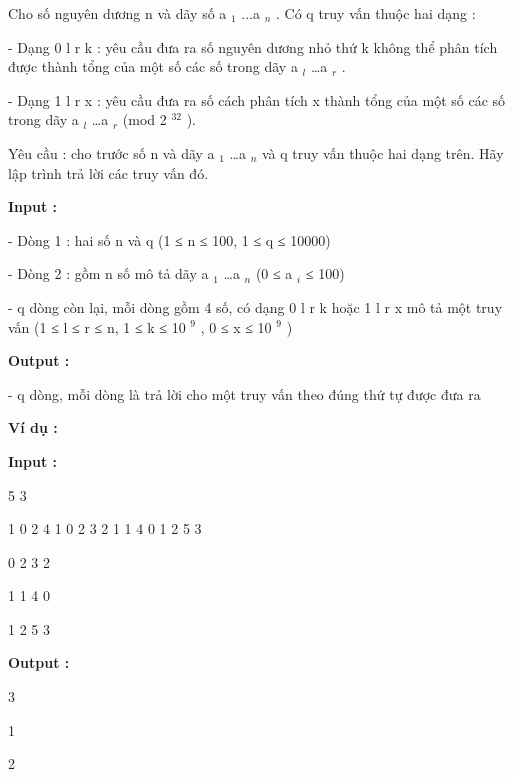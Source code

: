 







   Cho số nguyên dương n và dãy số a   $_    1   $   ...a   $_    n   $   . Có q truy vấn thuộc hai dạng :  

   - Dạng 0 l r k : yêu cầu đưa ra số nguyên dương nhỏ thứ k không thể phân tích được thành tổng của một số các số trong dãy a   $_    l   $   …a   $_    r   $   .  

   - Dạng 1 l r x : yêu cầu đưa ra số cách phân tích x thành tổng của một số các số trong dãy a   $_    l   $   …a   $_    r   $   (mod 2   $^    32   $   ).  

   Yêu cầu : cho trước số n và dãy a   $_    1   $   …a­   $_    n   $   và q truy vấn thuộc hai dạng trên. Hãy lập trình trả lời các truy vấn đó.  

\textbf{    Input :   }

\textbf{}   - Dòng 1 : hai số n và q (1 ≤ n ≤ 100, 1 ≤ q ≤ 10000)  

   - Dòng 2 : gồm n số mô tả dãy a   $_    1   $   …a   $_    n   $   (0 ≤ a   $_    i   $   ≤ 100)  

   - q dòng còn lại, mỗi dòng gồm 4 số, có dạng 0 l r k hoặc 1 l r x mô tả một truy vấn (1 ≤ l ≤ r ≤ n, 1 ≤ k ≤ 10   $^    9   $   , 0 ≤ x ≤ 10   $^    9   $   )  

\textbf{    Output :   }

\textbf{}   - q dòng, mỗi dòng là trả lời cho một truy vấn theo đúng thứ tự được đưa ra  

\textbf{    Ví dụ :   }

\textbf{    Input :   }

\textbf{}   5 3  

   1 0 2 4 1       0 2 3 2       1 1 4 0       1 2 5 3    

   0 2 3 2  

   1 1 4 0  

   1 2 5 3  

\textbf{    Output :   }

   3  

   1  

   2  

